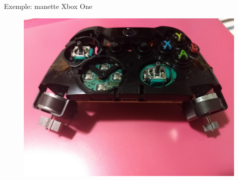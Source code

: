 \documentclass[compress, noflama]{beamer}
\begin{document}
\begin{frame}{Exemple: manette Xbox One}
\begin{figure}
\centering
\includegraphics[width=\linewidth]{images/xboxone}
\end{figure}
\end{frame}
\end{document}
